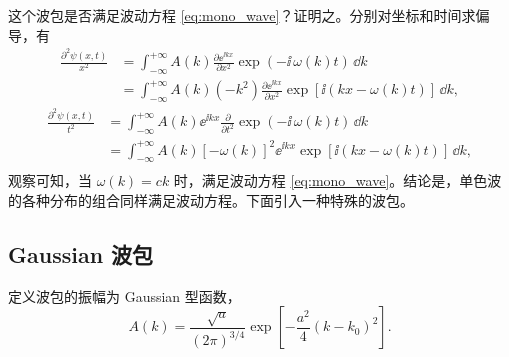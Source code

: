 这个波包是否满足波动方程 \eqref{eq:mono_wave}？证明之。分别对坐标和时间求偏导，有
\begin{align*}
    \frac{\partial^2\psi(x,t)}{x^2} 
    &= \int_{-\infty} ^{+\infty} A(k) \frac{\partial \ee^{\ii kx}}{\partial x^2} \exp(-\ii\,\omega(k) t) \,\dd k \\ 
    &= \int_{-\infty} ^{+\infty} A(k) (-k^2) \frac{\partial \ee^{\ii kx}}{\partial x^2} \exp[\ii(kx - \omega(k)t)] \,\dd k,
\end{align*}
\begin{align*}
    \frac{\partial^2\psi(x,t)}{t^2} 
    &= \int_{-\infty} ^{+\infty} A(k) \ee^{\ii kx} \frac{\partial}{\partial t^2}\exp(-\ii\,\omega(k) t) \,\dd k \\ 
    &= \int_{-\infty} ^{+\infty} A(k) \left[-\omega(k)\right]^2 \ee^{\ii kx} \exp[\ii(kx - \omega(k)t)] \,\dd k, \\
\end{align*}
观察可知，当 $\omega(k) = ck$ 时，满足波动方程 \eqref{eq:mono_wave}。结论是，单色波的各种分布的组合同样满足波动方程。下面引入一种特殊的波包。


\subsection{Gaussian 波包}

定义波包的振幅为 Gaussian 型函数，
\begin{equation}
    A(k) = \frac{\sqrt{a}}{(2 \pi)^{3/4}} \exp \left[ - \frac{a^2}{4} (k - k_0)^2 \right]. \label{eq:wp_gaussian_def}
\end{equation}

